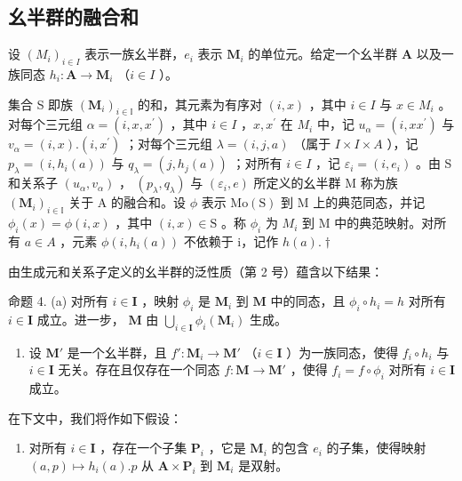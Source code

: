 \subsection{幺半群的融合和}

设 \((M_{i})_{i\in I}\) 表示一族幺半群，\(e_i\) 表示 \(\mathbf{M}_i\) 的单位元。给定一个幺半群 \(\mathbf{A}\) 以及一族同态 \(h_i\colon \mathbf{A}\to \mathbf{M}_i\) （\(i\in I\) ）。

集合 S 即族 \((\mathbf{M}_{i})_{i\in\mathbb{I}}\) 的和，其元素为有序对 \((i,x)\) ，其中 \(i\in I\) 与 \(x\in M_{i}\) 。对每个三元组 \(\alpha=(i,x,x^{\prime})\) ，其中 \(i\in I\) ，\(x,x^{\prime}\) 在 \(M_{i}\) 中，记 \(u_{\alpha}=(i,xx^{\prime})\) 与 \(v_{\alpha}=(i,x).(i,x^{\prime})\) ；对每个三元组 \(\lambda=(i,j,a)\) （属于 \(I\times I\times A\) ），记 \(p_{\lambda}=(i,h_{i}(a))\) 与 \(q_{\lambda}=(j,h_{j}(a))\) ；对所有 \(i\in I\) ，记 \(\varepsilon_{i}=(i,e_{i})\) 。由 S 和关系子 \((u_{\alpha},v_{\alpha})\) ， \((p_{\lambda},q_{\lambda})\) 与 \((\varepsilon_{i},e)\) 所定义的幺半群 M 称为族 \((\mathbf{M}_{i})_{i\in\mathbb{I}}\) 关于 A 的融合和。设 \(\phi\) 表示 \(\mathrm{Mo}(\mathrm{S})\) 到 M 上的典范同态，并记 \(\phi_{i}(x)=\phi(i,x)\) ，其中 \((i,x)\in\mathrm{S}\) 。称 \(\phi_{i}\) 为 \(M_{i}\) 到 M 中的典范映射。对所有 \(a\in A\) ，元素 \(\phi(i,h_{i}(a))\) 不依赖于 i，记作 \(h(a).†\)

由生成元和关系子定义的幺半群的泛性质（第 2 号）蕴含以下结果：

命题 4. (a) 对所有 \(i \in \mathbf{I}\) ，映射 \(\phi_i\) 是 \(\mathbf{M}_i\) 到 \(\mathbf{M}\) 中的同态，且 \(\phi_i \circ h_i = h\) 对所有 \(i \in \mathbf{I}\) 成立。进一步， \(\mathbf{M}\) 由 \(\bigcup_{i \in \mathbf{I}} \phi_i(\mathbf{M}_i)\) 生成。

\begin{enumerate}
\def\labelenumi{(\alph{enumi})}
\setcounter{enumi}{1}
\tightlist
\item
  设 \(\mathbf{M}'\) 是一个幺半群，且 \(f': \mathbf{M}_i \to \mathbf{M}'\) （\(i \in \mathbf{I}\) ）为一族同态，使得 \(f_i \circ h_i\) 与 \(i \in \mathbf{I}\) 无关。存在且仅存在一个同态 \(f: \mathbf{M} \to \mathbf{M}'\) ，使得 \(f_i = f \circ \phi_i\) 对所有 \(i \in \mathbf{I}\) 成立。
\end{enumerate}

在下文中，我们将作如下假设：

\begin{enumerate}
\def\labelenumi{(\Alph{enumi})}
\tightlist
\item
  对所有 \(i \in \mathbf{I}\) ，存在一个子集 \(\mathbf{P}_i\) ，它是 \(\mathbf{M}_i\) 的包含 \(e_i\) 的子集，使得映射 \((a, p) \mapsto h_i(a).p\) 从 \(\mathbf{A} \times \mathbf{P}_i\) 到 \(\mathbf{M}_i\) 是双射。
\end{enumerate}


